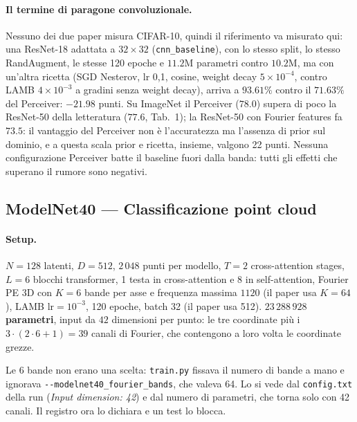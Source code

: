 \documentclass[
  11pt,
]{article}
\begin{document}
\paragraph{Il termine di paragone convoluzionale.} Nessuno dei due paper misura CIFAR-10, quindi il riferimento va misurato qui: una ResNet-18 adattata a $32\times32$ (\texttt{cnn\_baseline}), con lo stesso split, lo stesso RandAugment, le stesse 120 epoche e $11.2$M parametri contro $10.2$M, ma con un'altra ricetta (SGD Nesterov, lr 0,1, cosine, weight decay $5\times10^{-4}$, contro LAMB $4\times10^{-3}$ a gradini senza weight decay), arriva a $\mathbf{93.61\%}$ contro il $71.63\%$ del Perceiver: $-21.98$ punti. Su ImageNet il Perceiver ($78.0$) supera di poco la ResNet-50 della letteratura ($77.6$, Tab.~1); la ResNet-50 con Fourier features fa $73.5$: il vantaggio del Perceiver non è l'accuratezza ma l'assenza di prior sul dominio, e a questa scala prior e ricetta, insieme, valgono 22 punti. Nessuna configurazione Perceiver batte il baseline fuori dalla banda: tutti gli effetti che superano il rumore sono negativi.

\subsection{ModelNet40 --- Classificazione point cloud}
\label{sec:progetto-modelnet}

\paragraph{Setup.} $N=128$ latenti, $D=512$, $2\,048$ punti per modello, $T=2$ cross-attention stages, $L=6$ blocchi transformer, 1 testa in cross-attention e 8 in self-attention, Fourier PE 3D con $K=6$ bande per asse e frequenza massima $1120$ (il paper usa $K=64$), LAMB $\text{lr} = 10^{-3}$, 120 epoche, batch 32 (il paper usa 512). \textbf{$23\,288\,928$ parametri}, input da $42$ dimensioni per punto: le tre coordinate più i $3\cdot(2\cdot 6+1) = 39$ canali di Fourier, che contengono a loro volta le coordinate grezze.

Le 6 bande non erano una scelta: \texttt{train.py} fissava il numero di bande a mano e ignorava \texttt{-{}-modelnet40\_fourier\_bands}, che valeva 64. Lo si vede dal \texttt{config.txt} della run (\emph{Input dimension: 42}) e dal numero di parametri, che torna solo con 42 canali. Il registro ora lo dichiara e un test lo blocca.
\end{document}
